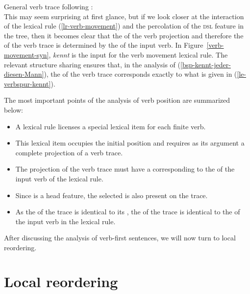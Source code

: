 \eas
General verb trace following :\\
\label{le-verbspur}
\zs
This may seem surprising at first glance, but if we look closer at the interaction of the lexical rule (\ref{lr-verb-movement}) and the percolation of the
\textsc{dsl} feature in the tree, then it becomes clear that the \dslv of the verb projection and therefore the \localv of the verb trace is determined by the \localv
of the input verb. In Figure~\ref{verb-movement-syn}, \emph{kennt} is the input for the verb
movement lexical rule. The relevant structure sharing ensures that, in
the analysis of (\ref{bsp-kennt-jeder-diesen-Mann}), the \localv of the verb trace corresponds exactly to what is given in (\ref{le-verbspur-kennt}).

The most important points of the analysis of verb position are summarized below:
\begin{itemize}
\item A lexical rule licenses a special lexical item for each finite verb.
\item This lexical item occupies the initial position and requires as its argument a complete projection of a verb trace.
\item The projection of the verb trace must have a \dslv corresponding to the \localv of the input verb of the lexical rule.
\item Since \dsl is a head feature, the selected \dslv is also present on the trace.
\item As the \dslv of the trace is identical to its \localv, the \localv of the trace is identical to the \localv of the input verb in the
lexical rule.
\end{itemize}

\noindent
After discussing the analysis of verb-first sentences, we will now turn to local reordering.

\section{Local reordering}
\label{sec-HPSG-lokale-Umstellung}
\label{Abschnitt-HPSG-lokale-Umstellung}

